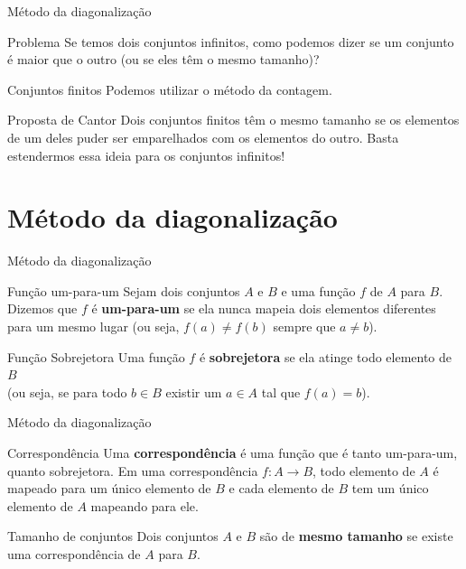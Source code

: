 \documentclass[xcolor=dvipsnames,table]{beamer}
\begin{document}
	\begin{frame}{Método da diagonalização}
		\begin{alertblock}{Problema}
			Se temos dois conjuntos infinitos, como podemos dizer se um conjunto é maior que o outro (ou se eles têm o mesmo tamanho)?
		\end{alertblock}  
		\begin{block}{Conjuntos finitos}
			Podemos utilizar o método da contagem.
		\end{block}  
		\begin{exampleblock}{Proposta de Cantor}
			Dois conjuntos finitos têm o mesmo tamanho se os elementos de um deles puder ser emparelhados com os elementos do outro. Basta estendermos essa ideia para os conjuntos infinitos!
		\end{exampleblock}
	\end{frame}

	\section{Método da diagonalização}
	
	\begin{frame}{Método da diagonalização}
		\begin{block}{Função um-para-um}
			Sejam dois conjuntos $A$ e $B$ e uma função $f$ de $A$ para $B$. Dizemos que $f$ é {\bf um-para-um} se ela nunca mapeia dois elementos diferentes para um mesmo lugar (ou seja, $f(a) \not= f(b)$ sempre que $a \not= b$).
		\end{block}	\pause	
		\begin{block}{Função Sobrejetora}		
			Uma função $f$ é {\bf sobrejetora} se ela atinge todo elemento de $B$ \\(ou seja, se para todo $b \in B$ existir um $a \in A$ tal que $f(a) = b$).
		\end{block} 
	\end{frame}
	
	\begin{frame}{Método da diagonalização}
		\begin{block}{Correspondência}
			Uma {\bf correspondência} é uma função que é tanto um-para-um, quanto sobrejetora. Em uma correspondência $f : A \rightarrow B$, todo elemento de $A$ é mapeado para um único elemento de $B$ e cada elemento de $B$ tem um único elemento de $A$ mapeando para ele. 
		\end{block} \pause
		\begin{block}{Tamanho de conjuntos}
			Dois conjuntos $A$ e $B$ são de {\bf mesmo tamanho} se existe uma correspondência de $A$ para $B$.
		\end{block}
	\end{frame}
	
\end{document}
